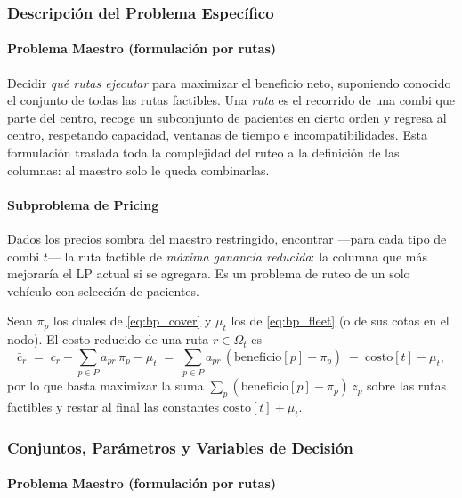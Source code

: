 \documentclass[12pt]{article}
\numberwithin{algorithm}{section}
\begin{document}
\subsubsection{Descripción del Problema Específico}

\paragraph{Problema Maestro (formulación por rutas)}

Decidir \emph{qué rutas ejecutar} para maximizar el beneficio neto, suponiendo conocido el conjunto de todas las rutas factibles. Una \emph{ruta} es el recorrido de una combi que parte del centro, recoge un subconjunto de pacientes en cierto orden y regresa al centro, respetando capacidad, ventanas de tiempo e incompatibilidades. Esta formulación traslada toda la complejidad del ruteo a la definición de las columnas: al maestro solo le queda combinarlas.

\paragraph{Subproblema de Pricing}

Dados los precios sombra del maestro restringido, encontrar ---para cada tipo de combi $t$--- la ruta factible de \emph{máxima ganancia reducida}: la columna que más mejoraría el LP actual si se agregara. Es un problema de ruteo de un solo vehículo con selección de pacientes.

Sean $\pi_p$ los duales de \eqref{eq:bp_cover} y $\mu_t$ los de \eqref{eq:bp_fleet} (o de sus cotas en el nodo). El costo reducido de una ruta $r \in \Omega_t$ es
\[
\bar{c}_r \;=\; c_r - \sum_{p \in P} a_{pr}\, \pi_p - \mu_t
\;=\; \sum_{p \in P} a_{pr}\, (\text{beneficio}[p] - \pi_p) \;-\; \text{costo}[t] - \mu_t,
\]
por lo que basta maximizar la suma $\sum_p (\text{beneficio}[p] - \pi_p)\, z_p$ sobre las rutas factibles y restar al final las constantes $\text{costo}[t] + \mu_t$.

\subsubsection{Conjuntos, Parámetros y Variables de Decisión}

\paragraph{Problema Maestro (formulación por rutas)}
\end{document}
